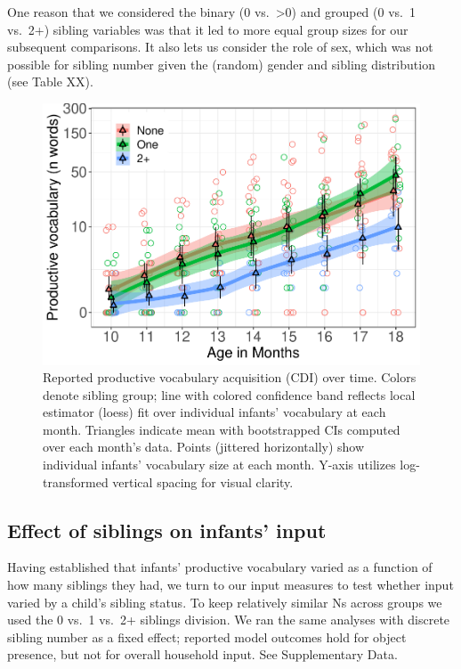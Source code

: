 \documentclass[
  english,
  man,floatsintext]{apa6}
\begin{document}
One reason that we considered the binary (0 vs.~\textgreater0) and grouped (0 vs.~1 vs.~2+) sibling variables was that it led to more equal group sizes for our subsequent comparisons. It also lets us consider the role of sex, which was not possible for sibling number given the (random) gender and sibling distribution (see Table XX).

\begin{figure}
\centering
\includegraphics{SiblingsStudyText_files/figure-latex/Figure-SibGroup-1.pdf}
\caption{\label{fig:Figure-SibGroup}Reported productive vocabulary acquisition (CDI) over time. Colors denote sibling group; line with colored confidence band reflects local estimator (loess) fit over individual infants' vocabulary at each month. Triangles indicate mean with bootstrapped CIs computed over each month's data. Points (jittered horizontally) show individual infants' vocabulary size at each month. Y-axis utilizes log-transformed vertical spacing for visual clarity.}
\end{figure}

\hypertarget{effect-of-siblings-on-infants-input}{%
\subsection{Effect of siblings on infants' input}\label{effect-of-siblings-on-infants-input}}

Having established that infants' productive vocabulary varied as a function of how many siblings they had, we turn to our input measures to test whether input varied by a child's sibling status. To keep relatively similar Ns across groups we used the 0 vs.~1 vs.~2+ siblings division. We ran the same analyses with discrete sibling number as a fixed effect; reported model outcomes hold for object presence, but not for overall household input. See Supplementary Data.
\end{document}
